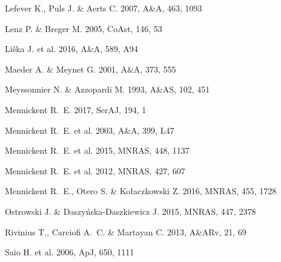 \documentclass[useAMS,usenatbib]{mn2e}
\begin{document}
\begin{thebibliography}{}
 Lefever K., Puls J. \& Aerts C. 2007, A\&A, 463, 1093 


 Lenz P. \& Breger M. 2005, CoAst, 146, 53 


 Li{\v s}ka J. et al. 2016, A\&A, 589, A94 



 Maeder A. \& Meynet G. 2001, A\&A, 373, 555 

 Meyssonnier N. \& Azzopardi M. 1993, A\&AS, 102, 451 


  Mennickent R.~E. 2017, SerAJ, 194, 1 

 Mennickent R.~E. et al. 2003, A\&A, 399, L47 

 Mennickent R.~E. et al. 2015, MNRAS, 448, 1137 


 Mennickent R.~E. et al. 2012, MNRAS, 427, 607 


 Mennickent R.~E., Otero S. \& Ko{\l}aczkowski Z. 2016, MNRAS, 455, 1728 


 Ostrowski J. \& Daszy{\'n}ska-Daszkiewicz J. 2015, MNRAS, 447, 2378 





 Rivinius T., Carciofi A.~C. \& Martayan C. 2013, A\&ARv, 21, 69 


 Saio H. et al. 2006, ApJ, 650, 1111 



\end{thebibliography}
\end{document}
